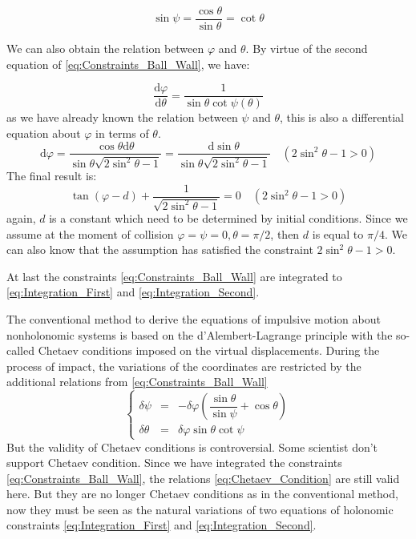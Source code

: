 \documentclass[preprint,12pt]{elsarticle}
\newcommand{\dif}{\mathrm{d}}
\begin{document}
 \begin{equation}\label{eq:Integration_First}
   \sin \psi=\frac{\cos \theta}{\sin \theta}=\cot \theta
 \end{equation}

We can also obtain the relation between $\varphi$ and $\theta$.
By virtue of the second equation of \eqref{eq:Constraints_Ball_Wall}, we have:

\begin{equation}
  \frac{\dif\varphi}{\dif\theta}=\frac{1}{\sin\theta \cot\psi(\theta)}
\end{equation}
as we have already known the relation between $\psi$ and $\theta$, this is also a differential equation about $\varphi$ in terms of $\theta$.
\[
\dif\varphi=\frac{\cos \theta \dif\theta}{\sin\theta \sqrt{2\sin^2\theta-1}}=\frac{ \dif\sin \theta}{\sin\theta \sqrt{2\sin^2\theta-1}}\quad(2\sin^2\theta-1>0)
\]
The final result is:
 \begin{equation}\label{eq:Integration_Second}
   \tan(\varphi-d)+\frac{1}{\sqrt{2\sin^2\theta-1}}=0\quad(2\sin^2\theta-1>0)
 \end{equation}
again, $d$ is a constant which need to be determined by initial conditions. Since we assume at the moment of collision $\varphi=\psi=0, \theta=\pi /2$, then $d$ is equal to $\pi/4$. We can also know that the assumption has satisfied the constraint $2\sin^2\theta-1>0$.

At last the constraints \eqref{eq:Constraints_Ball_Wall} are integrated to \eqref{eq:Integration_First} and \eqref{eq:Integration_Second}.

The conventional method to derive the equations of impulsive motion about nonholonomic systems is based on the d'Alembert-Lagrange principle with the so-called Chetaev conditions imposed on the virtual displacements. During the process of impact, the variations of the coordinates are restricted by the additional relations from \eqref{eq:Constraints_Ball_Wall}
\begin{equation}\label{eq:Chetaev_Condition}
 \left\{\begin{array}{rcl}
 \delta \psi  &=&- \delta \varphi \left(\dfrac{{\sin \theta }}{{\sin \psi }} + \cos \theta \right)\\
 \delta \theta & = &\delta \varphi \sin \theta \cot \psi
 \end{array}\right.
\end{equation}
But the validity of Chetaev conditions is controversial. Some scientist don't support Chetaev condition\cite{Guo}.
Since we have integrated the constraints \eqref{eq:Constraints_Ball_Wall}, the relations \eqref{eq:Chetaev_Condition} are still valid here. But they are no longer Chetaev conditions as in the conventional method, now they must be seen as the natural variations of two equations of holonomic constraints \eqref{eq:Integration_First} and \eqref{eq:Integration_Second}.
\end{document}

